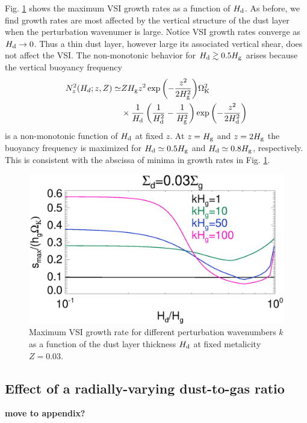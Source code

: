 Fig. \ref{compare_eigenvals_fixZ} shows the maximum VSI growth rates
as a function of $H_\mathrm{d}$. As before, we find growth
rates are most affected by the vertical structure of the dust layer
when the perturbation wavenumer is large. Notice VSI growth rates converge as
$H_\mathrm{d}\to 0$. %
Thus a thin dust layer, however large its associated vertical shear,
does not affect the VSI. The non-monotonic behavior for $H_\mathrm{d}\gtrsim
0.5H_\mathrm{g}$ arises because the vertical buoyancy frequency 
\begin{align*}
N_z^2(H_d;z,Z) \simeq &ZH_\mathrm{g} z^2
\exp{\left(-\frac{z^2}{2H_\mathrm{g}^2}\right)}\Omega_{\rm K}^2\notag\\
&\times 
\frac{1}{H_\mathrm{d}}\left(\frac{1}{H_\mathrm{d}^2} -
\frac{1}{H_\mathrm{g}^2}\right)\exp{\left(-\frac{z^2}{2H_\mathrm{d}^2}\right)}  
\end{align*}
is a non-monotonic function of $H_\mathrm{d}$ at fixed $z$. At $z=H_\mathrm{g}$ and $z=2H_\mathrm{g}$
the buoyancy frequency is maximized for $H_\mathrm{d}\simeq0.5H_\mathrm{g}$ and
$H_\mathrm{d}\simeq 0.8H_\mathrm{g}$, respectively. This is consistent with the abscissa
of minima in growth rates in Fig. \ref{compare_eigenvals_fixZ}. 

\begin{figure}
  \includegraphics[width=\linewidth]{figures/compare_eigenvals_fixZ} 
  \caption{Maximum VSI growth rate for different perturbation
    wavenumbers $k$ as a function of the dust layer
    thickness $H_\mathrm{d}$ at fixed metalicity $Z=0.03$. 
    \label{compare_eigenvals_fixZ}
    }
\end{figure}


\subsection{Effect of a radially-varying dust-to-gas ratio}\label{varHd}
{\bf move to appendix?}

